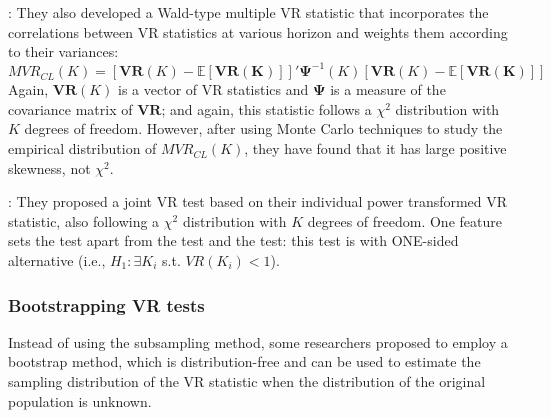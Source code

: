 \textbf{\citet[Wald-Type Test]{cecchetti1994variance}}: They also developed a Wald-type multiple VR statistic that incorporates the correlations between VR statistics at various horizon and weights
them according to their variances:
$$
MVR_{CL}(K) = [\mathbf{VR}(K)-\mathbb{E}[\mathbf{VR(K)}]]'\mathbf{\Psi}^{-1}(K)[\mathbf{VR}(K)-\mathbb{E}[\mathbf{VR(K)}]]
$$
Again, $\mathbf{VR}(K)$ is a vector of VR statistics and $\mathbf{\Psi}$ is a measure of the covariance matrix of $\mathbf{VR}$; and again, this statistic follows a $\chi^2$ distribution with $K$ degrees
of freedom. However, after using Monte Carlo techniques to study the empirical distribution of $MVR_{CL}(K)$, they have found that it has large positive skewness, not $\chi^2$.

\textbf{\citet[Wald-Type Test]{chen2006variance}}: They proposed a joint VR test based on their individual power transformed VR statistic, also following a $\chi^2$ distribution with $K$ degrees of freedom.
One feature sets the \citeauthor{chen2006variance} test apart from the \citeauthor{richardson1991tests} test and the \citeauthor{cecchetti1994variance} test: this test is with ONE-sided alternative (i.e., 
$H_1: \exists K_i$ s.t. $VR(K_i)<1$).

\subsubsection{Bootstrapping VR tests}
Instead of using the subsampling method, some researchers proposed to employ a bootstrap method, which is distribution-free and can be used to estimate the sampling distribution of the VR statistic when 
the distribution of the original population is unknown.